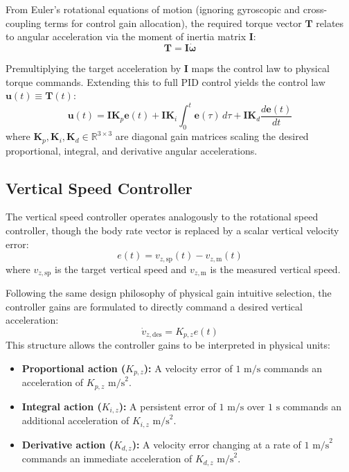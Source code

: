 \documentclass{article}
\begin{document}
	From Euler's rotational equations of motion (ignoring gyroscopic and cross-coupling terms for control gain allocation), the required torque vector $\bm{T}$ relates to angular acceleration via the moment of inertia matrix $\mathbf{I}$:
	\begin{equation}
		\bm{T} = \mathbf{I} \dot{\bm{\omega}}
	\end{equation}
	
	Premultiplying the target acceleration by $\mathbf{I}$ maps the control law to physical torque commands. Extending this to full PID control yields the control law $\bm{u}(t) \equiv \bm{T}(t)$:
	\begin{equation}
		\bm{u}(t) = \mathbf{I} \mathbf{K}_p \mathbf{e}(t) + \mathbf{I} \mathbf{K}_i \int_0^t \mathbf{e}(\tau) \, d\tau + \mathbf{I} \mathbf{K}_d \frac{d\mathbf{e}(t)}{dt}
	\end{equation}
	where $\mathbf{K}_p, \mathbf{K}_i, \mathbf{K}_d \in \mathbb{R}^{3 \times 3}$ are diagonal gain matrices scaling the desired proportional, integral, and derivative angular accelerations.
	
	\subsection{Vertical Speed Controller}
	
	The vertical speed controller operates analogously to the rotational speed controller, though the body rate vector is replaced by a scalar vertical velocity error:
	\begin{equation}
		e(t) = v_{z,\mathrm{sp}}(t) - v_{z,\mathrm{m}}(t)
	\end{equation}
	where $v_{z,\mathrm{sp}}$ is the target vertical speed and $v_{z,\mathrm{m}}$ is the measured vertical speed.
	
	Following the same design philosophy of physical gain intuitive selection, the controller gains are formulated to directly command a desired vertical acceleration:
	\begin{equation}
		\dot{v}_{z,\mathrm{des}} = K_{p,z} e(t)
	\end{equation}
	This structure allows the controller gains to be interpreted in physical units:
	\begin{itemize}
		\item \textbf{Proportional action ($K_{p,z}$):} A velocity error of $1\text{ m/s}$ commands an acceleration of $K_{p,z}\text{ m/s}^2$.
		\item \textbf{Integral action ($K_{i,z}$):} A persistent error of $1\text{ m/s}$ over $1\text{ s}$ commands an additional acceleration of $K_{i,z}\text{ m/s}^2$.
		\item \textbf{Derivative action ($K_{d,z}$):} A velocity error changing at a rate of $1\text{ m/s}^2$ commands an immediate acceleration of $K_{d,z}\text{ m/s}^2$.
	\end{itemize}
	
\end{document}
